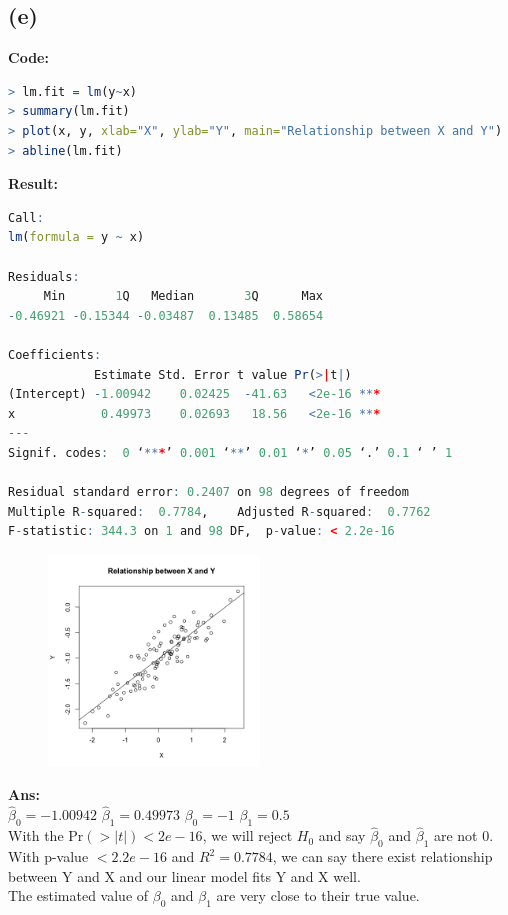 \documentclass[twoside]{homework}
\begin{document}
\subsection*{(e)}
\textbf{Code:}
\begin{lstlisting}[language=R]
> lm.fit = lm(y~x)
> summary(lm.fit)
> plot(x, y, xlab="X", ylab="Y", main="Relationship between X and Y")
> abline(lm.fit)
\end{lstlisting}
\textbf{Result:}
\begin{lstlisting}[language=R]
Call:
lm(formula = y ~ x)

Residuals:
     Min       1Q   Median       3Q      Max 
-0.46921 -0.15344 -0.03487  0.13485  0.58654 

Coefficients:
            Estimate Std. Error t value Pr(>|t|)    
(Intercept) -1.00942    0.02425  -41.63   <2e-16 ***
x            0.49973    0.02693   18.56   <2e-16 ***
---
Signif. codes:  0 ‘***’ 0.001 ‘**’ 0.01 ‘*’ 0.05 ‘.’ 0.1 ‘ ’ 1

Residual standard error: 0.2407 on 98 degrees of freedom
Multiple R-squared:  0.7784,	Adjusted R-squared:  0.7762 
F-statistic: 344.3 on 1 and 98 DF,  p-value: < 2.2e-16
\end{lstlisting}
\begin{figure}[!h]
\begin{center}
\includegraphics[width=0.5\textwidth]{HW1_P3_e.png}
\end{center}
\label{fig:HW1_P3_e}
\end{figure}
\textbf{Ans:}\\
$\hat{\beta}_0 = -1.00942$ \quad $\hat{\beta}_1 = 0.49973$ \qquad $\beta_0 = -1$ \quad $\beta_1 = 0.5$\\
With the $\mathrm{Pr}(>|t|) < 2e-16$, we will reject $H_0$ and say $\hat{\beta}_0$ and $\hat{\beta}_1$ are not 0.\\
With p-value $< 2.2e-16$ and $R^2 = 0.7784$, we can say there exist relationship between Y and X and our linear model fits Y and X well. \\
The estimated value of $\beta_0$ and $\beta_1$ are very close to their true value. 
\end{document}
